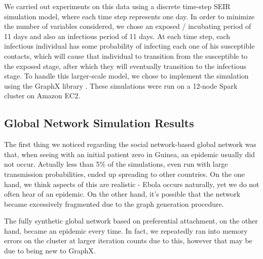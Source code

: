 \documentclass[10pt, journal,onecolumn]{IEEEtran}
\begin{document}
We carried out experiments on this data using a discrete time-step SEIR simulation model,
where each time step represents one day. In order to minimize the number of variables considered,
we chose an exposed / incubating period of 11 days and also an infectious period of 11 days.
At each time step, each
infectious individual has some probability of infecting each one of his susceptible contacts, which
will cause that individual to transition from the susceptible to the exposed stage, after which
they will eventually transition to the infectious stage. To handle this larger-scale model, we chose
to implement the simulation using the GraphX library \citep{xin2013graphx}.
These simulations were run on a 12-node Spark cluster on Amazon EC2.

\subsection{{Global Network Simulation Results}}

The first thing we noticed regarding the social network-based global network was that, when seeing
with an initial patient zero in Guinea, an epidemic usually did not occur. Actually less than 5\%
of the simulations, even run with large transmission probabilities, ended up spreading to other
countries. On the one hand, we think aspects of this are realistic - Ebola occurs naturally, yet we
do not often hear of an epidemic. On the other hand, it's possible that the network became excessively
fragmented due to the graph generation procedure.

The fully synthetic global network based on preferential attachment, on the other hand, became an
epidemic every time. In fact, we repeatedly ran into memory errors on the cluster at larger iteration
counts due to this, however that may be due to being new to GraphX.
\end{document}

